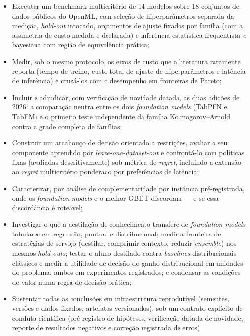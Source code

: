 \begin{itemize}
  \item Executar um benchmark multicritério de 14 modelos sobre 18
    conjuntos de dados públicos do OpenML, com seleção de
    hiperparâmetros separada da medição,
    \emph{hold-out} intocado, orçamentos de ajuste fixados por família
    (com a assimetria de custo medida e declarada) e inferência estatística frequentista \emph{e} bayesiana com
    região de equivalência prática;
  \item Medir, sob o mesmo protocolo, os eixos de custo que a literatura
    raramente reporta (tempo de treino, custo total de ajuste de
    hiperparâmetros e latência de inferência) e cruzá-los com o
    desempenho em fronteiras de Pareto;
  \item Incluir e adjudicar, com verificação de novidade datada, as duas
    adições de 2026: a comparação neutra entre os dois \emph{foundation
    models} (TabPFN e TabFM) e o primeiro teste independente da família
    Kolmogorov--Arnold contra a grade completa de famílias;
  \item Construir um arcabouço de decisão orientado a restrições,
    avaliar o seu componente aprendido por \emph{leave-one-dataset-out}
    e confrontá-lo com políticas fixas (avaliadas descritivamente) sob
    métrica de \emph{regret}, incluindo a extensão ao \emph{regret}
    multicritério ponderado por preferências de latência;
  \item Caracterizar, por análise de complementaridade por instância
    pré-registrada, onde os \emph{foundation models} e o melhor GBDT
    discordam --- e se essa discordância é roteável;
  \item Investigar o que a destilação de conhecimento transfere de
    \emph{foundation models} tabulares em regressão, pontual e
    distribucional; medir a fronteira de estratégias de serviço
    (destilar, comprimir contexto, reduzir \emph{ensemble}) nos mesmos
    \emph{hold-outs}; testar o aluno destilado contra \emph{baselines}
    distribucionais clássicos e medir a utilidade de decisão do ganho
    distribucional em unidades do problema, ambos em experimentos
    registrados; e condensar
    as condições de valor numa regra de decisão prática;
  \item Sustentar todas as conclusões em infraestrutura reprodutível
    (sementes, versões e dados fixados, artefatos versionados), sob um
    contrato explícito de conduta científica (pré-registro de
    hipóteses, verificação datada de novidade, reporte de resultados
    negativos e correção registrada de erros).
\end{itemize}

